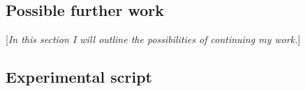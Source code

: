 \documentclass{pracamgr}
\makeatletter
\DeclareRobustCommand\ttfamily
        {\not@math@alphabet\ttfamily\mathtt
         \fontfamily\ttdefault\selectfont\hyphenchar\font=-1\relax}
\makeatother
\begin{document}
\section{Possible further work}
\label{sec:further_work}
[\textit{In this section I will outline the possibilities of continuing my work.}]

\printbibliography[heading=bibintoc]

\begin{appendices}

\chapter{Experimental script}
\label{cha:experimental_script}


\end{appendices}
\end{document}
